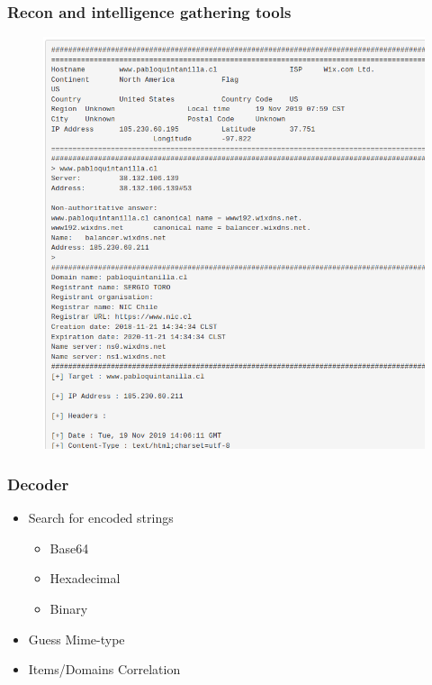 \documentclass{beamer}
\begin{document}
\begin{frame}
    \frametitle{Recon and intelligence gathering tools}
        \begin{figure}
            \includegraphics[scale=0.4]{images/recon-paste.png}
        \end{figure}
\end{frame}


\begin{frame}
    \frametitle{Decoder}
    \begin{itemize}
    	\item Search for encoded strings
    		\begin{itemize}
				\item Base64
				\item Hexadecimal
				\item Binary
			\end{itemize}
    	\item Guess Mime-type
    	\item Items/Domains Correlation
    \end{itemize}
\end{frame}

\end{document}
